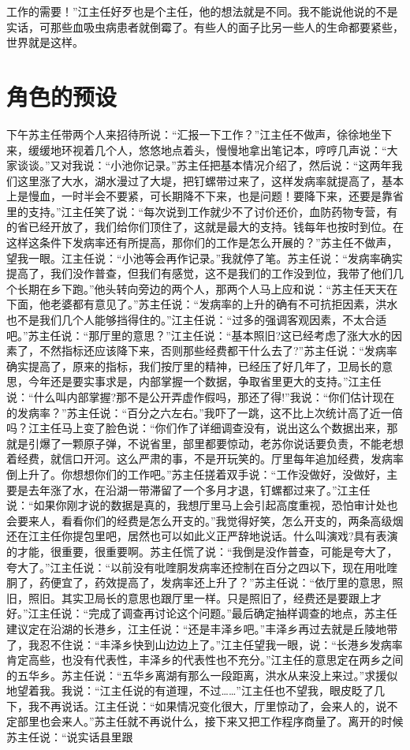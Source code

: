 \documentclass[12pt,oneside]{book}
\begin{document}
工作的需要！''江主任好歹也是个主任，他的想法就是不同。我不能说他说的不是实话，可那些血吸虫病患者就倒霉了。有些人的面子比另一些人的生命都要紧些，世界就是这样。


\chapter{角色的预设}

下午苏主任带两个人来招待所说：``汇报一下工作？''江主任不做声，徐徐地坐下来，缓缓地环视着几个人，悠悠地点着头，慢慢地拿出笔记本，哼哼几声说：``大家谈谈。''又对我说：``小池你记录。''苏主任把基本情况介绍了，然后说：``这两年我们这里涨了大水，湖水漫过了大堤，把钉螺带过来了，这样发病率就提高了，基本上是慢血，一时半会不要紧，可长期降不下来，也是问题！要降下来，还要是靠省里的支持。''江主任笑了说：``每次说到工作就少不了讨价还价，血防药物专营，有的省已经开放了，我们给你们顶住了，这就是最大的支持。钱每年也按时到位。在这样这条件下发病率还有所提高，那你们的工作是怎么开展的？''苏主任不做声，望我一眼。江主任说：``小池等会再作记录。''我就停了笔。苏主任说：``发病率确实提高了，我们没作普查，但我们有感觉，这不是我们的工作没到位，我带了他们几个长期在乡下跑。''他头转向旁边的两个人，那两个人马上应和说：``苏主任天天在下面，他老婆都有意见了。''苏主任说：``发病率的上升的确有不可抗拒因素，洪水也不是我们几个人能够挡得住的。''江主任说：``过多的强调客观因素，不太合适吧。''苏主任说：``那厅里的意思？''江主任说：``基本照旧?这已经考虑了涨大水的因素了，不然指标还应该降下来，否则那些经费都干什么去了?''苏主任说：``发病率确实提高了，原来的指标，我们按厅里的精神，已经压了好几年了，卫局长的意思，今年还是要实事求是，内部掌握一个数据，争取省里更大的支持。''江主任说：``什么叫内部掌握?那不是公开弄虚作假吗，那还了得!''我说：``你们估计现在的发病率？''苏主任说：``百分之六左右。''我吓了一跳，这不比上次统计高了近一倍吗？江主任马上变了脸色说：``你们作了详细调查没有，说出这么个数据出来，那就是引爆了一颗原子弹，不说省里，部里都要惊动，老苏你说话要负责，不能老想着经费，就信口开河。这么严肃的事，不是开玩笑的。厅里每年追加经费，发病率倒上升了。你想想你们的工作吧。''苏主任搓着双手说：``工作没做好，没做好，主要是去年涨了水，在沿湖一带滞留了一个多月才退，钉螺都过来了。''江主任说：``如果你刚才说的数据是真的，我想厅里马上会引起高度重视，恐怕审计处也会要来人，看看你们的经费是怎么开支的。''我觉得好笑，怎么开支的，两条高级烟还在江主任你提包里吧，居然也可以如此义正严辞地说话。什么叫演戏?具有表演的才能，很重要，很重要啊。苏主任慌了说：``我倒是没作普查，可能是夸大了，夸大了。''江主任说：``以前没有吡喹胴发病率还控制在百分之四以下，现在用吡喹胴了，药便宜了，药效提高了，发病率还上升了？''苏主任说：``依厅里的意思，照旧，照旧。其实卫局长的意思也跟厅里一样。只是照旧了，经费还是要跟上才好。''江主任说：``完成了调查再讨论这个问题。''最后确定抽样调查的地点，苏主任建议定在沿湖的长港乡，江主任说：``还是丰泽乡吧。''丰泽乡再过去就是丘陵地带了，我忍不住说：``丰泽乡快到山边边上了。''江主任望我一眼，说：``长港乡发病率肯定高些，也没有代表性，丰泽乡的代表性也不充分。''江主任的意思定在两乡之间的五华乡。苏主任说：``五华乡离湖有那么一段距离，洪水从来没上来过。''求援似地望着我。我说：``江主任说的有道理，不过\ldots\ldots{}''江主任也不望我，眼皮眨了几下，我不再说话。江主任说：``如果情况变化很大，厅里惊动了，会来人的，说不定部里也会来人。''苏主任就不再说什么，接下来又把工作程序商量了。离开的时候苏主任说：``说实话县里跟
\end{document}
